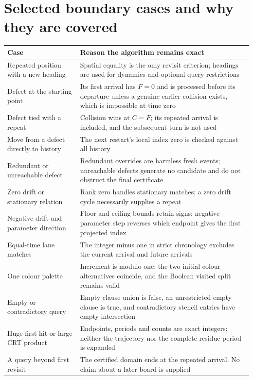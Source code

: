 \documentclass[11pt,letterpaper]{article}
\theoremstyle{definition}\newtheorem{definition}[theorem]{Definition}
\theoremstyle{remark}\newtheorem{remark}[theorem]{Remark}
\begin{document}
\section{Selected boundary cases and why they are covered}\label{ptr:app:cases}
\begin{longtable}{@{}>{\raggedright\arraybackslash}p{}>{\raggedright\arraybackslash}p{}@{}}
\toprule
Case & Reason the algorithm remains exact\\
\midrule
\endhead
Repeated position with a new heading & Spatial equality is the only revisit criterion; headings are used for dynamics and optional query restrictions\\[4pt]
Defect at the starting point & Its first arrival has $F=0$ and is processed before its departure unless a genuine earlier collision exists, which is impossible at time zero\\[4pt]
Defect tied with a repeat & Collision wins at $C=F$; its repeated arrival is included, and the subsequent turn is not used\\[4pt]
Move from a defect directly to history & The next restart's local index zero is checked against all history\\[4pt]
Redundant or unreachable defect & Redundant overrides are harmless fresh events; unreachable defects generate no candidate and do not obstruct the final certificate\\[4pt]
Zero drift or stationary relation & Rank zero handles stationary matches; a zero drift cycle necessarily supplies a repeat\\[4pt]
Negative drift and parameter direction & Floor and ceiling bounds retain signs; negative parameter step reverses which endpoint gives the first projected index\\[4pt]
Equal-time lane matches & The integer minus one in strict chronology excludes the current arrival and future arrivals\\[4pt]
One colour palette & Increment is modulo one; the two initial colour alternatives coincide, and the Boolean visited split remains valid\\[4pt]
Empty or contradictory query & Empty clause union is false, an unrestricted empty clause is true, and contradictory stencil entries have empty intersection\\[4pt]
Huge first hit or large CRT product & Endpoints, periods and counts are exact integers; neither the trajectory nor the complete residue period is expanded\\[4pt]
A query beyond first revisit & The certified domain ends at the repeated arrival. No claim about a later board is supplied\\
\bottomrule
\end{longtable}
\end{document}
